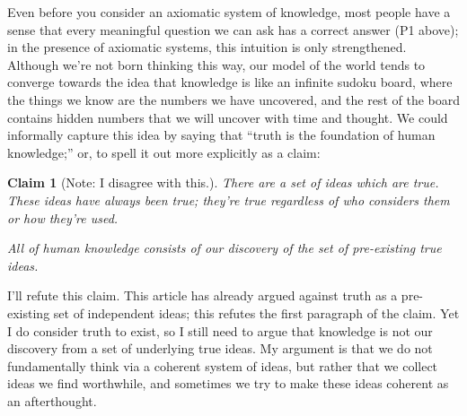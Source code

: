 \documentclass[11pt, oneside]{article}   	%
\newtheorem{claim}{Claim}
\begin{document}
Even before you consider an axiomatic system of knowledge, most people have a
sense that every meaningful question we can ask has a correct answer (P1
above); in the presence of axiomatic systems, this intuition is only
strengthened.
Although we're not born thinking this way, our model of the world tends to
converge towards the idea that knowledge is like an infinite sudoku board, where
the things we know are the numbers we have uncovered, and the rest of the board
contains hidden numbers that we will uncover with time and thought.
We could informally capture this idea by saying that ``truth is the foundation
of
human knowledge;'' or, to spell it out more explicitly as a claim:
\begin{claim}[Note: I disagree with this.]\label{c8}
    There are a set of ideas which are true.
    These ideas have always been true; they're true
    regardless of who considers them or how they're used.

    All of human knowledge consists of our discovery
    of the set of pre-existing true ideas.
\end{claim}

I'll refute this claim.
This article has already argued against truth
as a pre-existing set of independent ideas; this refutes the first paragraph of
the claim.
Yet I do consider truth to exist, so I still need to argue that knowledge is not
our discovery from a set of underlying true ideas.
My argument is that we
do not fundamentally
think via a coherent system of ideas, but rather that we collect ideas we
find worthwhile, and sometimes we try to make these ideas coherent as an
afterthought.
\end{document}
